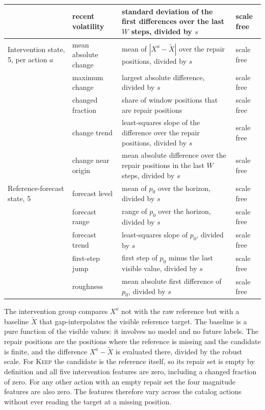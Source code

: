 \documentclass{article}
\begin{document}
\begin{table}[htbp]
{\begin{tabular}{@{}l p{} p{} p{}@{}}
     & recent volatility & standard deviation of the first differences over the last $W$ steps, divided by $s$ & scale free \\
    \midrule
    Intervention state, 5, per action $a$ & mean absolute change & mean of $|X^{a} - \tilde{X}|$ over the repair positions, divided by $s$ & scale free \\
     & maximum change & largest absolute difference, divided by $s$ & scale free \\
     & changed fraction & share of window positions that are repair positions & scale free \\
     & change trend & least-squares slope of the difference over the repair positions, divided by $s$ & scale free \\
     & change near origin & mean absolute difference over the repair positions in the last $W$ steps, divided by $s$ & scale free \\
    \midrule
    Reference-forecast state, 5 & forecast level & mean of $p_0$ over the horizon, divided by $s$ & scale free \\
     & forecast range & range of $p_0$ over the horizon, divided by $s$ & scale free \\
     & forecast trend & least-squares slope of $p_0$, divided by $s$ & scale free \\
     & first-step jump & first step of $p_0$ minus the last visible value, divided by $s$ & scale free \\
     & roughness & mean absolute first difference of $p_0$, divided by $s$ & scale free \\
    \bottomrule
  \end{tabular}}
\end{table}

The intervention group compares $X^{a}$ not with the raw reference but with a baseline
$\tilde{X}$ that gap-interpolates the visible reference target. The baseline is a pure
function of the visible values: it involves no model and no future labels. The repair
positions are the positions where the reference is missing and the candidate is finite, and
the difference $X^{a} - \tilde{X}$ is evaluated there, divided by the robust scale. For
\textsc{Keep} the candidate is the reference itself, so its repair set is empty by
definition and all five intervention features are zero, including a changed fraction of
zero. For any other action with an empty repair set the four magnitude features are also
zero. The features therefore vary across the catalog actions without ever reading the
target at a missing position.
\end{document}
